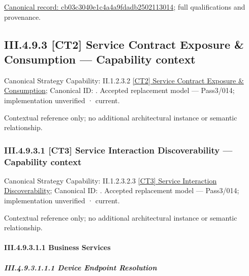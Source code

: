 {\footnotesize \href{../../../../../../../../continuum/business/business-function/cb03c3040e1c4a4a9fdadb2502113014.md}{Canonical record: cb03c3040e1c4a4a9fdadb2502113014}; full qualifications and provenance.}\par
\subsection*{III.4.9.3 [CT2] Service Contract Exposure \& Consumption — Capability context}
\label{navigation:III.4.9.3}

{\small Canonical Strategy Capability: II.1.2.3.2 \hyperref[element:bee33783461e4d1bb0cd354c1fb8560e]{[CT2] Service Contract Exposure \& Consumption}; Canonical ID: \texttt{}. Accepted replacement model — Pass3/014; implementation unverified · current.}\par
Contextual reference only; no additional architectural instance or semantic relationship.\par
\subsubsection*{III.4.9.3.1 [CT3] Service Interaction Discoverability — Capability context}
\label{navigation:III.4.9.3.1}

{\small Canonical Strategy Capability: II.1.2.3.2.3 \hyperref[element:84a28d9f09684d3ba6446d0f7d6cdf7f]{[CT3] Service Interaction Discoverability}; Canonical ID: \texttt{}. Accepted replacement model — Pass3/014; implementation unverified · current.}\par
Contextual reference only; no additional architectural instance or semantic relationship.\par
\paragraph*{III.4.9.3.1.1 Business Services}
\label{navigation:III.4.9.3.1.1}

\subparagraph*{III.4.9.3.1.1.1 Device Endpoint Resolution}
\label{navigation:III.4.9.3.1.1.1}

